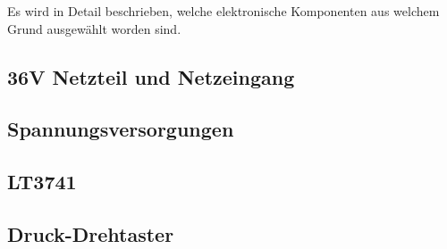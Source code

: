 Es wird  in  Detail  beschrieben,  welche  elektronische Komponenten aus welchem
Grund ausgew\"ahlt worden sind.

\subsection{36V Netzteil und Netzeingang}



\subsection{Spannungsversorgungen}



\subsection{LT3741}



\subsection{Druck-Drehtaster}



